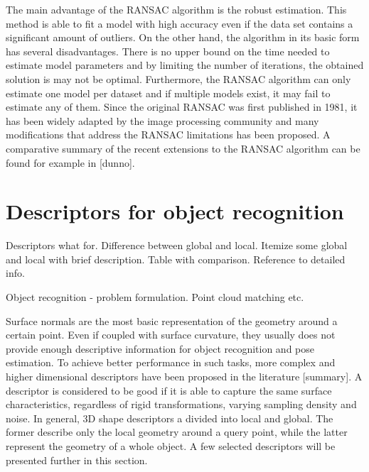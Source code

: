 The main advantage of the RANSAC algorithm is the robust estimation. This method is able to fit a model with high accuracy even if the data set contains a significant amount of outliers. On the other hand, the algorithm in its basic form has several disadvantages. There is no upper bound on the time needed to estimate model parameters and by limiting the number of iterations, the obtained solution is may not be optimal. Furthermore, the RANSAC algorithm can only estimate one model per dataset and if multiple models exist, it may fail to estimate any of them. Since the original RANSAC was first published in 1981, it has been widely adapted by the image processing community and many modifications that address the RANSAC limitations has been proposed. A comparative summary of the recent extensions to the RANSAC algorithm can be found for example in [dunno].


\section{Descriptors for object recognition}
\label{sec:descriptors}

Descriptors what for. Difference between global and local. Itemize some global and local with brief description. Table with comparison. Reference to detailed info.

Object recognition - problem formulation. Point cloud matching etc.

Surface normals are the most basic representation of the geometry around a certain point. Even if coupled with surface curvature, they usually does not provide enough descriptive information for object recognition and pose estimation. To achieve better performance in such tasks, more complex and higher dimensional descriptors have been proposed in the literature [summary]. A descriptor is considered to be good if it is able to capture the same surface characteristics, regardless of rigid transformations, varying sampling density and noise. In general, 3D shape descriptors a divided into local and global. The former describe only the local geometry around a query point, while the latter represent the geometry of a whole object. A few selected descriptors will be presented further in this section.

